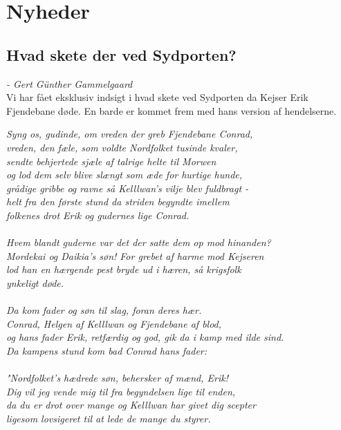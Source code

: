 \documentclass[letterpaper,12pt]{memoir}
\newenvironment{pullquote}
  {\begin{tcolorbox}[enhanced, breakable]\itshape\large}
  {\end{tcolorbox}}
\begin{document}
\section*{Nyheder}
\subsection*{Hvad skete der ved Sydporten?}
\textit{- Gert Günther Gammelgaard}\\
Vi har fået eksklusiv indsigt i hvad skete ved Sydporten da Kejser Erik Fjendebane døde. En barde er kommet frem med hans version af hendelserne.

\begin{pullquote}
Syng os, gudinde, om vreden der greb Fjendebane Conrad,\\
vreden, den fæle, som voldte Nordfolket tusinde kvaler, \\
sendte behjertede sjæle af talrige helte til Morwen\\
og lod dem selv blive slængt som æde for hurtige hunde,\\
grådige gribbe og ravne så Kelllwan's vilje blev fuldbragt -\\
helt fra den første stund da striden begyndte imellem\\
folkenes drot Erik og gudernes lige Conrad.\\\\
Hvem blandt guderne var det der satte dem op mod hinanden?\\
Mordekai og Daikia's søn! For grebet af harme mod Kejseren\\
lod han en hærgende pest bryde ud i hæren, så krigsfolk\\
ynkeligt døde. \\\\
Da kom fader og søn til slag, foran deres hær.  \\
Conrad, Helgen af Kelllwan og Fjendebane af blod, \\
og hans fader Erik, retfærdig og god, gik da i kamp med ilde sind.\\
Da kampens stund kom bad Conrad hans fader:\\\\
"Nordfolket's hædrede søn, behersker af mænd, Erik!\\
Dig vil jeg vende mig til fra begyndelsen lige til enden, \\
da du er drot over mange og Kelllwan har givet dig scepter\\
ligesom lovsigeret til at lede de mange du styrer.\\

\end{pullquote}
\end{document}
